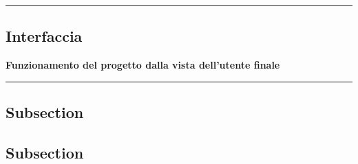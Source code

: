 {\color{gray}\hrule}
\begin{center}
\section{Interfaccia}
\textbf{Funzionamento del progetto dalla vista dell'utente finale}
\bigskip
\end{center}
{\color{gray}\hrule}

\subsection{Subsection}
\lipsum[1]
\subsection{Subsection}
\lipsum[1-3]

\pagebreak
